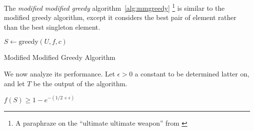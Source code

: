 The \emph{modified modified greedy} algorithm~\ref{alg:mmgreedy} 
\footnote{A paraphraze on the ``ultimate ultimate weapon'' from \cite{ninjago2017}}
is similar to the  modified greedy algorithm, 
except it considers the best pair of element rather than the best singleton element.


\begin{algorithm}[H]
\label{alg:mmgreedy}



$S \leftarrow \text{greedy}(U, f, c)$
\\
\caption{Modified Modified Greedy Algorithm}
\end{algorithm}

We now analyze its performance.
Let $\epsilon > 0$ a constant to be determined latter on, and let $T$ be the output of 
the algorithm.

\begin{theorem}
$f(S) \geq 1 - e^{-(1/2 + \epsilon)}$
\end{theorem}


